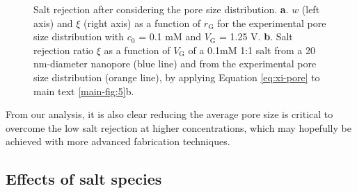 \begin{figure}[htbp]
  \centering
   \caption{Salt rejection after considering the pore size
     distribution. \textbf{a}. $w$ (left axis) and $\xi$ (right axis)
     as a function of $r_{\mathrm{G}}$ for the experimental pore size
     distribution with $c_{0}$ = 0.1 mM and $V_{\mathrm{G}}$ = 1.25 V.
     \textbf{b}. Salt rejection ratio $\xi$ as a function of $V_{\mathrm{G}}$ of a
     0.1mM 1:1 salt from a 20 nm-diameter nanopore (blue line) and
     from the experimental pore size distribution (orange line), by
     applying Equation \autoref{eq:xi-pore} to main text 
     \autoref{main-fig:5}b.}
  \label{fig:np-simple-rect-pore}
\end{figure}

From our
analysis, it is also clear reducing the average pore size is critical
to overcome the low salt rejection at higher concentrations, which may
hopefully be achieved with more advanced fabrication techniques.


\subsection{Effects of salt species}
\label{sec:np-salts}

